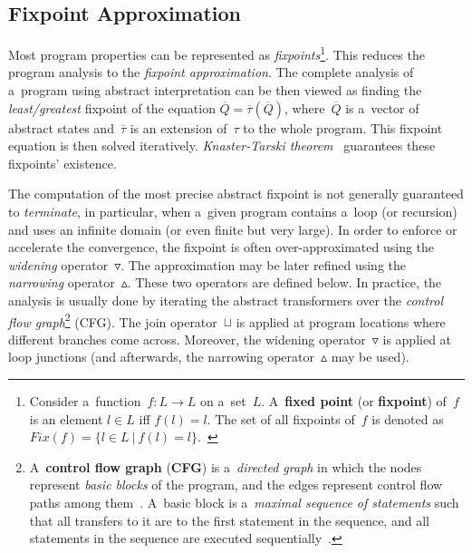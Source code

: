 \subsection{Fixpoint Approximation~\cite{AILatticeModelCousot, wideningNarrowingCousot, savAI, staticAnalysisMoller, programAnalysisNielson, staticAnalysisRival}}
\label{sec:AIFixpoints}

Most program properties can be represented as \emph{fixpoints}\footnote{Consider a~function~$ f : L \rightarrow L $ on a~set~$ L $. A~\textbf{fixed point} (or \textbf{fixpoint}) of~$ f $ is an element $ l \in L $ iff $ f(l) = l $. The set of all fixpoints of~$ f $ is denoted as $ Fix(f) = \{l \in L\ |\ f(l) = l\} $.~\cite{programAnalysisNielson}}. This reduces the program analysis to the \emph{fixpoint approximation}. The complete analysis of a~program using abstract interpretation can be then viewed as finding the \emph{least/greatest} fixpoint of the equation $ \overline{Q} = \overline{\tau}(\overline{Q}) $, where~$ \overline{Q} $ is a~vector of abstract states and~$ \overline{\tau} $ is an extension of~$ \tau $ to the whole program. This fixpoint equation is then solved iteratively. \emph{Knaster-Tarski theorem}~\cite{tarski} guarantees these fixpoints' existence.

The computation of the most precise abstract fixpoint is not generally guaranteed to \emph{terminate}, in particular, when a~given program contains a~loop (or recursion) and uses an infinite domain (or even finite but very large). In order to enforce or accelerate the convergence, the fixpoint is often over-approximated using the \emph{widening} operator~$ \triangledown $. The approximation may be later refined using the \emph{narrowing} operator~$ \vartriangle $. These two operators are defined below. In practice, the analysis is usually done by iterating the abstract transformers over the \emph{control flow graph}\footnote{A~\textbf{control flow graph} (\textbf{CFG}) is a~\emph{directed graph} in which the nodes represent \emph{basic blocks} of the program, and the edges represent control flow paths among them~\cite{controlFlowAnalysisAllen}. A~basic block is a~\emph{maximal sequence of statements} such that all transfers to it are to the first statement in the sequence, and all statements in the sequence are executed sequentially~\cite{programAnalysisNielson}.} (CFG). The join operator~$ \sqcup $ is applied at program locations where different branches come across. Moreover, the widening operator~$ \triangledown $ is applied at loop junctions (and afterwards, the narrowing operator~$ \vartriangle $ may be used).

